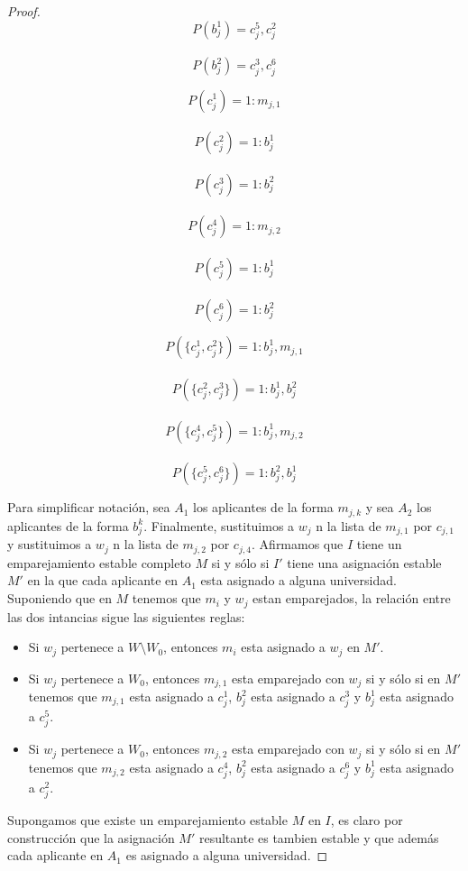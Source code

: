 \begin{proof}
\begin{minipage}{.3\linewidth}
$$P(b_j^1)=c_j^5,c_j^2$$ \\
$$P(b_j^2)=c_j^3,c_j^6$$ 
\end{minipage}%
\begin{minipage}{.3\linewidth}
$$P(c_j^1)=1:m_{j,1}$$ \\
$$P(c_j^2)=1:b_j^1$$ \\
$$P(c_j^3)=1: b_j^2$$ \\
$$P(c_j^4)=1:  m_{j,2}$$ \\
$$P(c_j^5)=1:  b_j^1$$ \\
$$P(c_j^6)=1:  b_j^2$$ 
\end{minipage}
\begin{minipage}{.4\linewidth}
$$P(\{c_j^1,c_j^2\})= 1:b_j^1,m_{j,1}$$ \\
$$P(\{c_j^2,c_j^3\})=1:b_j^1,b_j^2$$ \\
$$P(\{c_j^4,c_j^5\})= 1:b_j^1,m_{j,2}$$ \\
$$P(\{c_j^5,c_j^6\})=1:b_j^2,b_j^1$$
\end{minipage}
Para simplificar notación, sea $A_1$ los aplicantes de la forma $m_{j,k}$ y sea $A_2$ los aplicantes de la forma $b_j^k$. Finalmente, sustituimos a $w_j$ n la lista de $m_{j,1}$ por $c_{j,1}$ y sustituimos a $w_j$ n la lista de $m_{j,2}$ por $c_{j,4}$. Afirmamos que $I$ tiene un emparejamiento estable completo $M$ si y sólo si $I'$ tiene una asignación estable $M'$ en la que cada aplicante en $A_1$ esta asignado a alguna universidad. Suponiendo que en $M$ tenemos que $m_i$ y $w_j$ estan emparejados, la relación entre las dos intancias sigue las siguientes reglas:
\begin{itemize}
\item Si $w_j$ pertenece a $W \setminus W_0$, entonces $m_i$ esta asignado a $w_j$ en $M'$.
\item Si $w_j$ pertenece a $W_0$, entonces $m_{j,1}$ esta emparejado con $w_j$ si y sólo si en $M'$ tenemos que $m_{j,1}$ esta asignado a $c_j^1$, $b_j^2$ esta asignado a $c_j^3$ y $b_j^1$ esta asignado a $c_j^5$.
\item Si $w_j$ pertenece a $W_0$, entonces $m_{j,2}$ esta emparejado con $w_j$ si y sólo si en $M'$ tenemos que $m_{j,2}$ esta asignado a $c_j^4$, $b_j^2$ esta asignado a $c_j^6$ y $b_j^1$ esta asignado a $c_j^2$.
\end{itemize}
Supongamos que existe un emparejamiento estable $M$ en $I$, es claro por construcción que la asignación $M'$ resultante es tambien estable y que además cada aplicante en $A_1$ es asignado a alguna universidad.  


\end{proof}
